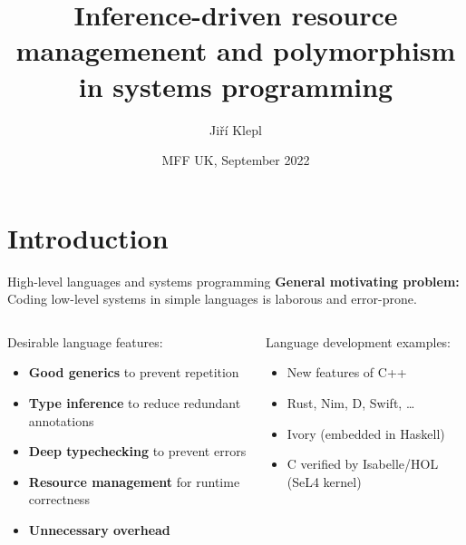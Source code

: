 \documentclass[aspectratio=169]{beamer}
\author{Jiří Klepl}
\title{Inference-driven resource managemenent and polymorphism in systems programming}
\date{MFF UK, September 2022}
\begin{document}
\maketitle

\section{Introduction}

\begin{frame}{High-level languages and systems programming}
\textbf{General motivating problem:}\\
Coding low-level systems in simple languages is laborous and error-prone.

\vspace{5ex}
\begin{columns}
\begin{column}{.5\linewidth}
Desirable language features:
\begin{itemize}\scriptsize
\item \textbf{Good generics} to prevent repetition
\item \textbf{Type inference} to reduce redundant annotations
\item \textbf{Deep typechecking} to prevent errors
\item \textbf{Resource management} for runtime correctness
\item[\color{red} \faTimes] \textbf{Unnecessary overhead}
\end{itemize}
\end{column}\pause
\begin{column}{.5\linewidth}
Language development examples:
  \begin{itemize}\scriptsize
  \item New features of C++
  \item Rust, Nim, D, Swift, \dots
  \item Ivory (embedded in Haskell)
  \item C verified by Isabelle/HOL (SeL4 kernel)
  \end{itemize}
\end{column}
\end{columns}
\end{frame}
\end{document}
